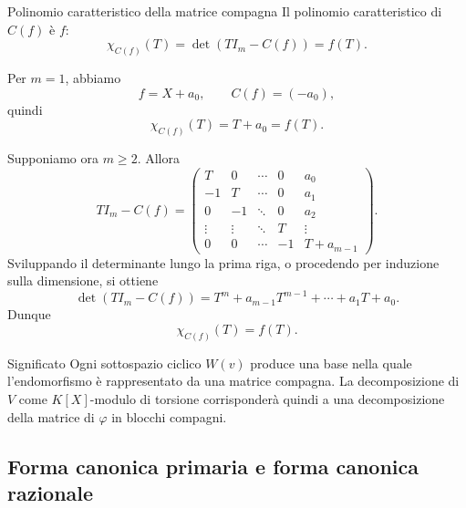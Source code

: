 \documentclass[a4paper]{article}
\begin{document}
\begin{radioactive}
\begin{snippetlemma}{Polinomio caratteristico della matrice compagna}
    Il polinomio caratteristico di \(C(f)\) è \(f\):
    \[
        \chi_{C(f)}(T)=\det(TI_m-C(f))=f(T).
    \]
\end{snippetlemma}
\end{radioactive}

\begin{radioactive}
\begin{snippetproof}{}
    Per \(m=1\), abbiamo
    \[
        f=X+a_0,
        \qquad
        C(f)=(-a_0),
    \]
    quindi
    \[
        \chi_{C(f)}(T)=T+a_0=f(T).
    \]

    Supponiamo ora \(m\geq 2\). Allora
    \[
        TI_m-C(f)
        =
        \begin{pmatrix}
            T & 0 & \cdots & 0 & a_0\\
            -1 & T & \cdots & 0 & a_1\\
            0 & -1 & \ddots & 0 & a_2\\
            \vdots & \vdots & \ddots & T & \vdots\\
            0 & 0 & \cdots & -1 & T+a_{m-1}
        \end{pmatrix}.
    \]
    Sviluppando il determinante lungo la prima riga, o procedendo per induzione sulla dimensione, si ottiene
    \[
        \det(TI_m-C(f))
        =
        T^m+a_{m-1}T^{m-1}+\cdots+a_1T+a_0.
    \]
    Dunque
    \[
        \chi_{C(f)}(T)=f(T).
    \]
\end{snippetproof}
\end{radioactive}

\begin{radioactive}
\begin{snippetremark}{Significato}
    Ogni sottospazio ciclico \(W(v)\) produce una base nella quale l'endomorfismo è rappresentato da una matrice compagna.
    La decomposizione di \(V\) come \(K[X]\)-modulo di torsione corrisponderà quindi a una decomposizione della matrice di \(\varphi\) in blocchi compagni.
\end{snippetremark}
\end{radioactive}

\pagebreak

\subsection{Forma canonica primaria e forma canonica razionale}
\end{document}
